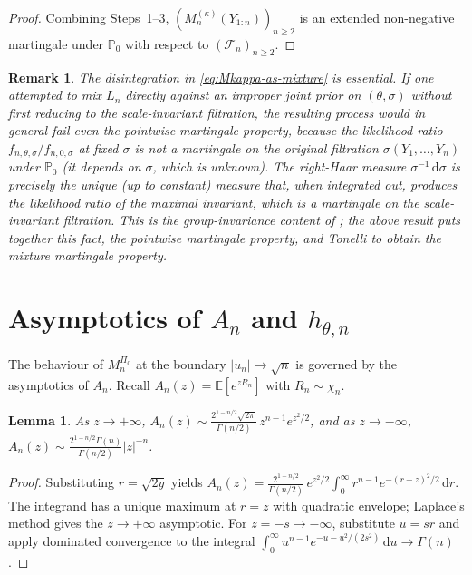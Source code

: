 \documentclass[numsec,webpdf,modern,medium,namedate]{oup-authoring-template}
\theoremstyle{thmstyleone}%
\theoremstyle{thmstyletwo}%
\newtheorem{remark}{Remark}%
\theoremstyle{thmstylethree}%
\newtheorem{lemma}[theorem]{Lemma}
\newcommand{\E}{\mathbb{E}}
\newcommand{\dd}{\,\mathrm{d}}
\newcommand{\1}{\mathbf{1}}
\begin{document}
\begin{appendices}
\begin{proof}
\smallskip\noindent Combining Steps~1--3, $(M_n^{(\kappa)}(Y_{1:n}))_{n\geq 2}$
is an extended non-negative martingale under $\mathbb{P}_0$ with respect to
$(\mathcal{F}_n)_{n\geq 2}$.
\end{proof}

\begin{remark}
    The disintegration in \eqref{eq:Mkappa-as-mixture} is essential. If one attempted to mix \(L_n\) directly against an improper joint prior on \((\theta,\sigma)\) without first reducing to the scale-invariant filtration, the resulting process would in general fail even the pointwise martingale property, because the likelihood ratio
\(f_{n,\theta,\sigma}/f_{n,0,\sigma}\) at fixed \(\sigma\) is not a
martingale on the original filtration \(\sigma(Y_1,\ldots,Y_n)\) under
\(\mathbb{P}_0\) (it depends on \(\sigma\), which is unknown). The
right-Haar measure \(\sigma^{-1}\dd\sigma\) is precisely the unique
(up to constant) measure that, when integrated out, produces the
likelihood ratio of the maximal invariant, which is a
martingale on the scale-invariant filtration. This is the
group-invariance content of \cite{PerezOrtiz2024}; the above result puts together this fact, the pointwise martingale property,
and Tonelli to obtain the mixture martingale property.
\end{remark}


\section{Asymptotics of \texorpdfstring{$A_n$}{An} and \texorpdfstring{$h_{\theta,n}$}{h{theta,n}}}\label{app:An}
The behaviour of \(M_n^{\Pi_0}\) at the boundary \(|u_n|\to\sqrt n\) is
governed by the asymptotics of \(A_n\). Recall \(A_n(z)=\E[e^{zR_n}]\)
with \(R_n\sim\chi_n\).

\begin{lemma}\label{lem:An-asymp}
As \(z\to+\infty\),
\(A_n(z)\sim \frac{2^{1-n/2}\sqrt{2\pi}}{\Gamma(n/2)}\,z^{n-1}e^{z^2/2}\),
and as \(z\to-\infty\),
\(A_n(z)\sim \frac{2^{1-n/2}\Gamma(n)}{\Gamma(n/2)}|z|^{-n}\).
\end{lemma}

\begin{proof}
Substituting \(r=\sqrt{2y}\) yields
\(A_n(z) = \frac{2^{1-n/2}}{\Gamma(n/2)}\,e^{z^2/2}\int_0^\infty
r^{n-1}e^{-(r-z)^2/2}\dd r\). The integrand has a unique maximum at
\(r=z\) with quadratic envelope; Laplace's method gives the
\(z\to+\infty\) asymptotic. For \(z=-s\to-\infty\), substitute
\(u=sr\) and apply dominated convergence to the integral
\(\int_0^\infty u^{n-1}e^{-u-u^2/(2s^2)}\dd u\to\Gamma(n)\).
\end{proof}


\end{appendices}
\end{document}
